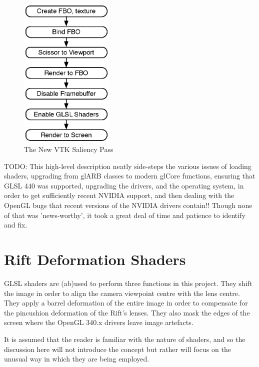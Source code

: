 \documentclass[MSc,paper=a4,pagesize=auto]{icldt}
\begin{document}
\begin{figure}[htbp!]
    \centering
    \includegraphics[width=0.4\textwidth]{resources/vtk_saliency}
    \caption{The New VTK Saliency Pass}
    \label{fig:vtk_saliency}
\end{figure}

TODO: This high-level description neatly side-steps the various issues of loading shaders, upgrading from glARB classes to modern glCore functions, ensuring that GLSL 440 was supported, upgrading the drivers, and the operating system, in order to get sufficiently recent NVIDIA support, and then dealing with the OpenGL bugs that recent versions of the NVIDIA drivers contain!! Though none of that was 'news-worthy', it took a great deal of time and patience to identify and fix. 

\section{Rift Deformation Shaders}
GLSL shaders are (ab)used to perform three functions in this project. They shift the image in order to align the camera viewpoint centre with the lens centre. They apply a barrel deformation of the entire image in order to compensate for the pincushion deformation of the Rift's lenses.  They also mask the edges of the screen where the OpenGL 340.x drivers leave image artefacts. 


It is assumed that the reader is familiar with the nature of shaders, and so the discussion here will not introduce the concept but rather will focus on the unusual way in which they are being employed. 
\end{document}
